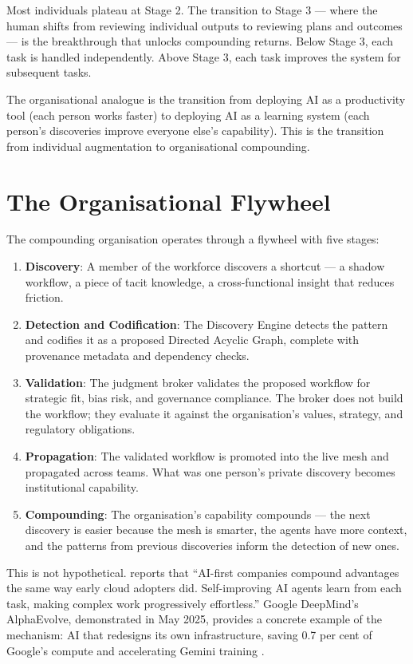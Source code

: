 Most individuals plateau at Stage 2. The transition to Stage 3 --- where the human shifts from reviewing individual outputs to reviewing plans and outcomes --- is the breakthrough that unlocks compounding returns. Below Stage 3, each task is handled independently. Above Stage 3, each task improves the system for subsequent tasks.

The organisational analogue is the transition from deploying AI as a productivity tool (each person works faster) to deploying AI as a learning system (each person's discoveries improve everyone else's capability). This is the transition from individual augmentation to organisational compounding.

\section{The Organisational Flywheel}

The compounding organisation operates through a flywheel with five stages:

\begin{enumerate}
  \item \textbf{Discovery}: A member of the workforce discovers a shortcut --- a shadow workflow, a piece of tacit knowledge, a cross-functional insight that reduces friction.
  \item \textbf{Detection and Codification}: The Discovery Engine detects the pattern and codifies it as a proposed Directed Acyclic Graph, complete with provenance metadata and dependency checks.
  \item \textbf{Validation}: The judgment broker validates the proposed workflow for strategic fit, bias risk, and governance compliance. The broker does not build the workflow; they evaluate it against the organisation's values, strategy, and regulatory obligations.
  \item \textbf{Propagation}: The validated workflow is promoted into the live mesh and propagated across teams. What was one person's private discovery becomes institutional capability.
  \item \textbf{Compounding}: The organisation's capability compounds --- the next discovery is easier because the mesh is smarter, the agents have more context, and the patterns from previous discoveries inform the detection of new ones.
\end{enumerate}

This is not hypothetical. \textcite{BCGAgenticShift2025} reports that ``AI-first companies compound advantages the same way early cloud adopters did. Self-improving AI agents learn from each task, making complex work progressively effortless.'' Google DeepMind's AlphaEvolve, demonstrated in May 2025, provides a concrete example of the mechanism: AI that redesigns its own infrastructure, saving 0.7 per cent of Google's compute and accelerating Gemini training \parencite{AlphaEvolve2025}.

